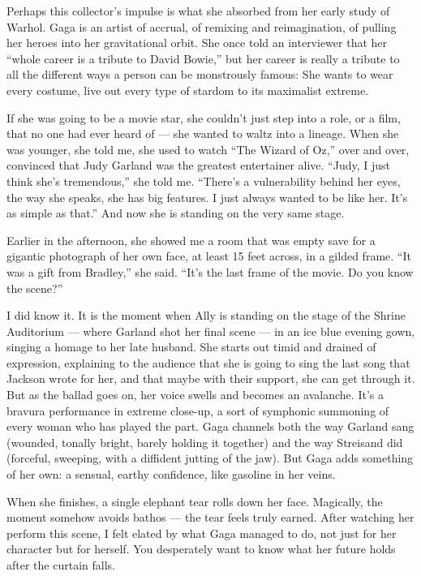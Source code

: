 Perhaps this collector's impulse is what she absorbed from her early
study of Warhol. Gaga is an artist of accrual, of remixing and
reimagination, of pulling her heroes into her gravitational orbit. She
once told an interviewer that her ``whole career is a tribute to David
Bowie,'' but her career is really a tribute to all the different ways a
person can be monstrously famous: She wants to wear every costume, live
out every type of stardom to its maximalist extreme.

If she was going to be a movie star, she couldn't just step into a role,
or a film, that no one had ever heard of --- she wanted to waltz into a
lineage. When she was younger, she told me, she used to watch ``The
Wizard of Oz,'' over and over, convinced that Judy Garland was the
greatest entertainer alive. ``Judy, I just think she's tremendous,'' she
told me. ``There's a vulnerability behind her eyes, the way she speaks,
she has big features. I just always wanted to be like her. It's as
simple as that.'' And now she is standing on the very same stage.

Earlier in the afternoon, she showed me a room that was empty save for a
gigantic photograph of her own face, at least 15 feet across, in a
gilded frame. ``It was a gift from Bradley,'' she said. ``It's the last
frame of the movie. Do you know the scene?''

I did know it. It is the moment when Ally is standing on the stage of
the Shrine Auditorium --- where Garland shot her final scene --- in an
ice blue evening gown, singing a homage to her late husband. She starts
out timid and drained of expression, explaining to the audience that she
is going to sing the last song that Jackson wrote for her, and that
maybe with their support, she can get through it. But as the ballad goes
on, her voice swells and becomes an avalanche. It's a bravura
performance in extreme close-up, a sort of symphonic summoning of every
woman who has played the part. Gaga channels both the way Garland sang
(wounded, tonally bright, barely holding it together) and the way
Streisand did (forceful, sweeping, with a diffident jutting of the jaw).
But Gaga adds something of her own: a sensual, earthy confidence, like
gasoline in her veins.

When she finishes, a single elephant tear rolls down her face.
Magically, the moment somehow avoids bathos --- the tear feels truly
earned. After watching her perform this scene, I felt elated by what
Gaga managed to do, not just for her character but for herself. You
desperately want to know what her future holds after the curtain falls.

